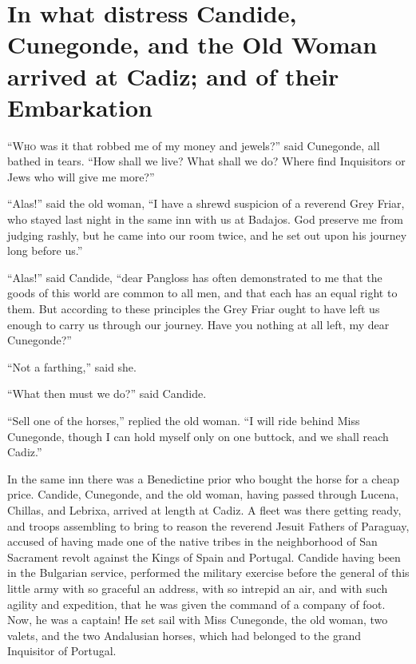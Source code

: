 \vspace{1cm}
\begingroup
\let\clearpage\relax
\chapter{In what distress Candide, Cunegonde, and the Old Woman arrived at Cadiz; and of their Embarkation}
\endgroup
\vspace{-1cm}
\lettrine[lraise=0.1,nindent=0em,slope=-.5em]{``W}{ho} was it that robbed me of my money and jewels?'' said Cunegonde, all bathed in tears. ``How shall we live? What shall we do? Where find Inquisitors or Jews who will give me more?''

``Alas!'' said the old woman, ``I have a shrewd suspicion of a reverend Grey Friar, who stayed last night in the same inn with us at Badajos. God preserve me from judging rashly, but he came into our room twice, and he set out upon his journey long before us.''

``Alas!'' said Candide, ``dear Pangloss has often demonstrated to me that the goods of this world are common to all men, and that each has an equal right to them. But according to these principles the Grey Friar ought to have left us enough to carry us through our journey. Have you nothing at all left, my dear Cunegonde?''

``Not a farthing,'' said she.

``What then must we do?'' said Candide.

``Sell one of the horses,'' replied the old woman. ``I will ride behind Miss Cunegonde, though I can hold myself only on one buttock, and we shall reach Cadiz.''

In the same inn there was a Benedictine prior who bought the horse for a cheap price. Candide, Cunegonde, and the old woman, having passed through Lucena, Chillas, and Lebrixa, arrived at length at Cadiz. A fleet was there getting ready, and troops assembling to bring to reason the reverend Jesuit Fathers of Paraguay, accused of having made one of the native tribes in the neighborhood of San Sacrament revolt against the Kings of Spain and Portugal. Candide having been in the Bulgarian service, performed the military exercise before the general of this little army with so graceful an address, with so intrepid an air, and with such agility and expedition, that he was given the command of a company of foot. Now, he was a captain! He set sail with Miss Cunegonde, the old woman, two valets, and the two Andalusian horses, which had belonged to the grand Inquisitor of Portugal.

